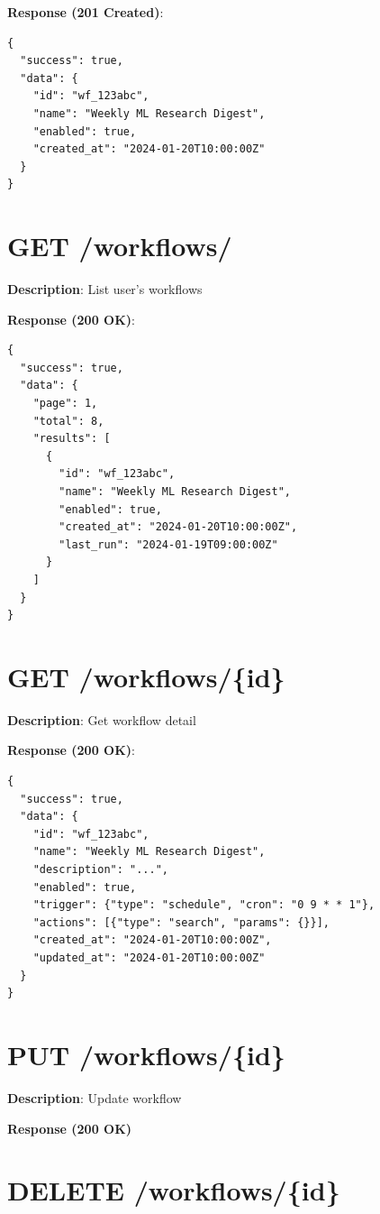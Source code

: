 \documentclass[12pt,a4paper]{report}
\begin{document}
\textbf{Response (201 Created)}:
\begin{lstlisting}
{
  "success": true,
  "data": {
    "id": "wf_123abc",
    "name": "Weekly ML Research Digest",
    "enabled": true,
    "created_at": "2024-01-20T10:00:00Z"
  }
}
\end{lstlisting}

\section{GET /workflows/}

\textbf{Description}: List user's workflows

\textbf{Response (200 OK)}:
\begin{lstlisting}
{
  "success": true,
  "data": {
    "page": 1,
    "total": 8,
    "results": [
      {
        "id": "wf_123abc",
        "name": "Weekly ML Research Digest",
        "enabled": true,
        "created_at": "2024-01-20T10:00:00Z",
        "last_run": "2024-01-19T09:00:00Z"
      }
    ]
  }
}
\end{lstlisting}

\section{GET /workflows/\{id\}}

\textbf{Description}: Get workflow detail

\textbf{Response (200 OK)}:
\begin{lstlisting}
{
  "success": true,
  "data": {
    "id": "wf_123abc",
    "name": "Weekly ML Research Digest",
    "description": "...",
    "enabled": true,
    "trigger": {"type": "schedule", "cron": "0 9 * * 1"},
    "actions": [{"type": "search", "params": {}}],
    "created_at": "2024-01-20T10:00:00Z",
    "updated_at": "2024-01-20T10:00:00Z"
  }
}
\end{lstlisting}

\section{PUT /workflows/\{id\}}

\textbf{Description}: Update workflow

\textbf{Response (200 OK)}

\section{DELETE /workflows/\{id\}}
\end{document}
